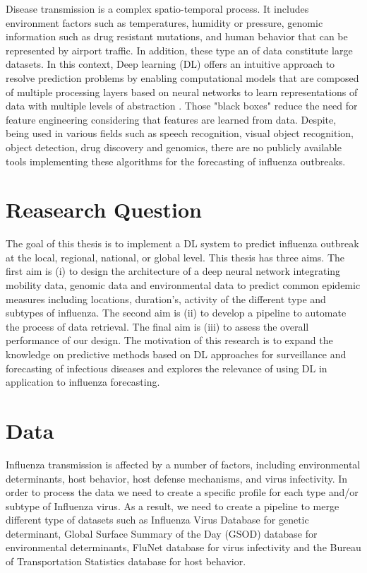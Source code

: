 \documentclass[12pt]{article}
\begin{document}
Disease transmission is a complex spatio-temporal process. It includes environment factors\autocite{Pica2012} such as temperatures, humidity or pressure, genomic information such as drug resistant mutations, and human behavior that can be represented by airport traffic. In addition, these type an of data constitute large datasets. In this context, Deep learning (DL) offers an intuitive  approach to resolve prediction problems by enabling computational models that are composed of multiple processing layers based on neural networks to learn representations of data with multiple levels of abstraction  \autocite{Lecon2015, Miotto2017}. Those "black boxes" reduce the need for feature engineering considering that features are learned from data. Despite, being used in various fields such as speech recognition, visual object recognition, object detection, drug discovery and genomics, there are no publicly available tools implementing these algorithms for the forecasting of influenza outbreaks.

\section{Reasearch Question}

The goal of this thesis is to implement a DL system to predict influenza outbreak at the local, regional, national, or global level. This thesis has three aims. The first aim is (i) to design the architecture of a deep neural network integrating mobility data, genomic data and environmental data to predict common epidemic measures \autocite{nsoesie2014} including locations,  duration's, activity of the different type and subtypes of influenza. The second aim is (ii) to develop a pipeline to automate the process of data retrieval. The final aim is (iii) to assess the overall performance of our design. The motivation of this research is to expand the knowledge on predictive methods based on DL approaches for surveillance and forecasting of infectious diseases and explores the relevance of using DL in application to influenza forecasting. 

\section{Data}
 
 Influenza transmission is affected by a number of factors, including environmental determinants, host behavior, host defense mechanisms, and virus infectivity\autocite{Pica2012}. In order to process the data we need to create a specific profile for each type and/or subtype of Influenza virus. As a result, we need to create a pipeline to merge different type of datasets such as Influenza Virus Database\autocite{chang2006influenza} for genetic determinant, Global Surface Summary of the Day (GSOD)\autocite{Lott1998} database for environmental determinants, FluNet database\autocite{flahault1998} for virus infectivity and the Bureau of Transportation Statistics database\autocite{mcdonald2013} for host behavior.
\end{document}
